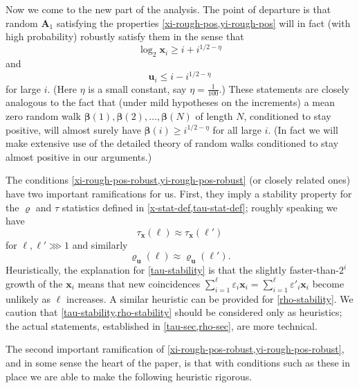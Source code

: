 \documentclass[11pt,reqno]{amsart}
\numberwithin{equation}{section}
\theoremstyle{definition}
\theoremstyle{remark}
\newcommand{\mbf}{\mathbf}
\newcommand{\eps}{\varepsilon}
\def\boldbeta{\boldsymbol\beta}
\renewcommand{\le}{\leqslant}
\renewcommand{\ge}{\geqslant}
\begin{document}
Now we come to the new part of the analysis. The point of departure is that random $\mbf{A}_1$ satisfying the properties \cref{xi-rough-pos,yi-rough-pos} will in fact (with high probability) robustly satisfy them in the sense that
\begin{equation}\label{xi-rough-pos-robust} \log_2 \mbf{x}_i \ge i + i^{1/2 - \eta}\end{equation}
and
\begin{equation}\label{yi-rough-pos-robust} \mbf{u}_i \le i - i^{1/2 - \eta}\end{equation} for large $i$. (Here $\eta$ is a small constant, say $\eta = \frac{1}{100}$.)
These statements are closely analogous to the fact that (under mild hypotheses on the increments) a mean zero random walk $\boldbeta(1),\boldbeta(2),\dots, \boldbeta(N)$ of length $N$, conditioned to stay positive, will almost surely have $\boldbeta(i) \ge i^{1/2 - \eta}$ for all large $i$. (In fact we will make extensive use of the detailed theory of random walks conditioned to stay almost positive in our arguments.)

The conditions \cref{xi-rough-pos-robust,yi-rough-pos-robust} (or closely related ones) have two important ramifications for us. First, they imply a stability property for the $\varrho$ and $\tau$ statistics defined in \cref{x-stat-def,tau-stat-def}; roughly speaking we have
\begin{equation}\label{tau-stability} \tau_{\mbf{x}}(\ell) \approx \tau_{\mbf{x}}(\ell')\end{equation} for $\ell, \ell' \ggg 1$ and similarly
\begin{equation}\label{rho-stability} \varrho_{\mbf{u}}(\ell) \approx \varrho_{\mbf{u}}(\ell').\end{equation}
Heuristically, the explanation for \cref{tau-stability} is that the slightly faster-than-$2^i$ growth of the $\mbf{x}_i$ means that new coincidences $\sum_{i = 1}^{\ell} \eps_i \mbf{x}_i = \sum_{i = 1}^{\ell}\eps'_i \mbf{x}_i$ become unlikely as $\ell$ increases. A similar heuristic can be provided for \cref{rho-stability}.
We caution that \cref{tau-stability,rho-stability} should be considered only as heuristics; the actual statements, established in \cref{tau-sec,rho-sec}, are more technical.

The second important ramification of \cref{xi-rough-pos-robust,yi-rough-pos-robust}, and in some sense the heart of the paper, is that with conditions such as these in place we are able to make the following heuristic rigorous.
\end{document}
